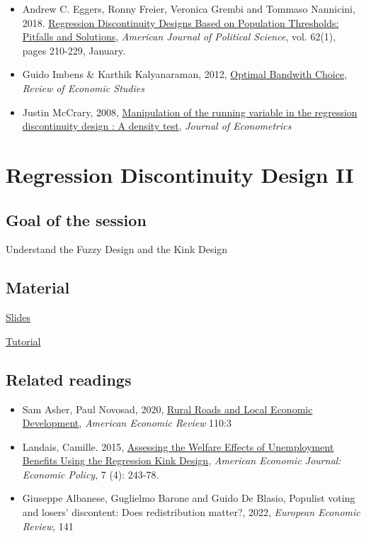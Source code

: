 \documentclass[a4paper,french,11pt]{article}
\begin{document}
\begin{itemize}
  \item Andrew C. Eggers, Ronny Freier, Veronica Grembi and Tommaso Nannicini, 2018. \href{https://drive.google.com/file/d/1iXKOoPy21cAyEY13W7wRR7X1E3FoxcJX/view?usp=sharing}{Regression Discontinuity Designs Based on Population Thresholds: Pitfalls and Solutions}, \textit{American Journal of Political Science}, vol. 62(1), pages 210-229, January.
\item Guido Imbens \& Karthik Kalyanaraman, 2012, \href{https://drive.google.com/open?id=1sQPUUmZAiE9LDIN_kYshvlPcQvLzsGa7}{Optimal Bandwith Choice}, \textit{Review of Economic Studies}

\item Justin McCrary, 2008, \href{https://drive.google.com/open?id=1uQtAy-h9ihbWR1je0vi7fg4kjjUMzvtu}{Manipulation of the running variable in the regression discontinuity design : A density test}, \textit{Journal of Econometrics}
\end{itemize}

\section{Regression Discontinuity Design II }
\subsection*{Goal of the session}
Understand the Fuzzy Design and the Kink Design

\subsection*{Material}
\href{https://drive.google.com/file/d/1unA_f7DVyF3c-rC_mKHyfhqfYS7STKs3/view}{Slides}

\href{https://drive.google.com/file/d/14oxjya-fe9xPgOaAUwPSs6CSAdE8ZQLu/view}{Tutorial}


\subsection*{Related readings}
\begin{itemize}

 \item Sam Asher, Paul Novosad, 2020, \href{http://paulnovosad.com/pdf/asher-novosad-roads.pdf}{Rural Roads and Local Economic Development}, \textit{American Economic Review} 110:3 
  \item Landais, Camille. 2015, \href{https://drive.google.com/file/d/1YlpybUxWDs7uXR-LCtJLfktJoOPemYp8/view?usp=share_link}{Assessing the Welfare Effects of Unemployment Benefits Using the Regression Kink Design}, \textit{American Economic Journal: Economic Policy}, 7 (4): 243-78.
  \item Giuseppe Albanese, Guglielmo Barone and Guido De Blasio, Populist voting and losers’ discontent: Does redistribution matter?, 2022, 
  \textit{European Economic Review}, 141
 \end{itemize}
 
\end{document}
